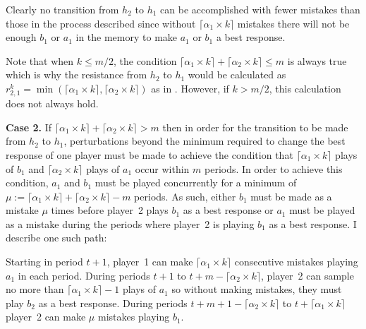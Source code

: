 \documentclass[11.5pt]{article}
\begin{document}
Clearly no transition from $h_2$ to $h_1$ can be accomplished with fewer mistakes than those in the process described since without $\lceil \alpha_1 \times k \rceil$ mistakes there will not be enough $b_1$ or $a_1$ in the memory to make $a_1$ or $b_1$ a best response. 

Note that when $k \leq m/2$, the condition $\lceil \alpha_1 \times k \rceil + \lceil \alpha_2 \times k \rceil \leq m$ is always true which is why the resistance from $h_2$ to $h_1$ would be calculated as $r_{2,1}^{k} = \min(\lceil \alpha_1 \times k \rceil, \lceil \alpha_2 \times k \rceil)$ as in \cite{Young1998}. However, if $k > m/2$, this calculation does not always hold. 




{\bf Case 2.} If $\lceil \alpha_1 \times k \rceil + \lceil \alpha_2 \times k \rceil > m$ then in order for the transition to be made from $h_2$ to $h_1$, perturbations beyond the minimum required to change the best response of one player must be made to achieve the condition that $\lceil \alpha_1 \times k \rceil$ plays of $b_1$ and $\lceil \alpha_2 \times k \rceil$ plays of $a_1$ occur within $m$ periods. In order to achieve this condition, $a_1$ and $b_1$ must be played concurrently for a minimum of $\mu := \lceil \alpha_1 \times k \rceil+\lceil \alpha_2 \times k \rceil-m$ periods. As such, either $b_1$ must be made as a mistake $\mu$ times before player~2 plays $b_1$ as a best response or $a_1$ must be played as a mistake during the periods where player~2 is playing $b_1$ as a best response. I describe one such path:

Starting in period $t+1$, player~1 can make $\lceil \alpha_1 \times k \rceil$ consecutive mistakes playing $a_1$ in each period. During periods $t+1$ to $t+m-\lceil \alpha_2 \times k \rceil$, player~2 can sample no more than $\lceil \alpha_1 \times k \rceil - 1$ plays of $a_1$ so without making mistakes, they must play $b_2$ as a best response. During periods $t+m+1-\lceil \alpha_2 \times k \rceil$ to $t+\lceil \alpha_1 \times k \rceil$ player~2 can make $\mu$ mistakes playing $b_1$. 
\end{document}
